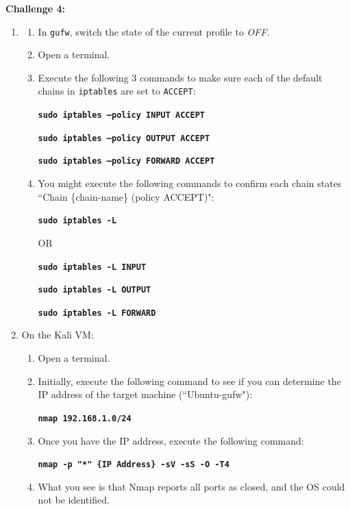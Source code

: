 \documentclass[12pt]{extarticle}
\newcommand{\ben}{\begin{enumerate}}
\newcommand{\een}{\end{enumerate}}
\begin{document}
\vspace{4mm}
\item \textbf{Challenge 4:}\\
\begin{enumerate}
\item \ben
        \item In \texttt{gufw}, switch the state of the current profile to \textit{OFF}.
        \item Open a terminal.
        \item Execute the following 3 commands to make sure each of the default chains in \texttt{iptables} are set to \texttt{ACCEPT}:
        
        \texttt{\textbf{sudo iptables --policy INPUT ACCEPT}}

        \texttt{\textbf{sudo iptables --policy OUTPUT ACCEPT}}

        \texttt{\textbf{sudo iptables --policy FORWARD ACCEPT}}
        
        \item You might execute the following commands to confirm each chain states ``Chain \{chain-name\} (policy ACCEPT)":
        
        \texttt{\textbf{sudo iptables -L}}
        
        OR
        
        \texttt{\textbf{sudo iptables -L INPUT}}
        
        \texttt{\textbf{sudo iptables -L OUTPUT}}
        
        \texttt{\textbf{sudo iptables -L FORWARD}}
        
    \een
\item On the Kali VM:
    \ben
        \item Open a terminal.
        \item Initially, execute the following command to see if you can determine the IP address of the target machine (``Ubuntu-gufw"):
        
        \texttt{\textbf{nmap 192.168.1.0/24}}
        
        \item Once you have the IP address, execute the following command:

        \texttt{\textbf{nmap -p "*" \{IP Address\} -sV -sS -O -T4}}
        
        \item What you see is that Nmap reports all ports as closed, and the OS could not be identified.
    \een


\end{enumerate}
\end{document}
